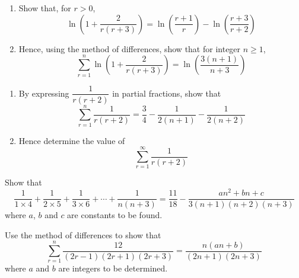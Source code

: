 \documentclass[leqno]{article}
\begin{document}
\djsFrontMatter
\begin{enumerate}[
  label=\textbf{\arabic*.},
  leftmargin=*,
  topsep=0pt,
  partopsep=0pt,
  parsep=0pt
]

\questionitem

\begin{enumerate}[label=\textbf{(\alph*)}]
  \item Show that, for $r>0$,
  \[
  \ln\left(1+\frac{2}{r(r+3)}\right)=\ln\left(\frac{r+1}{r}\right)-\ln\left(\frac{r+3}{r+2}\right)
  \]
  \item Hence, using the method of differences, show that for integer $n\geq 1$,
  \[
  \sum_{r=1}^{n}\ln\left(1+\frac{2}{r(r+3)}\right)=\ln\left(\frac{3(n+1)}{n+3}\right)
  \]
\end{enumerate}

\newpage

\questionitem

\begin{enumerate}[label=\textbf{(\alph*)}]
  \item By expressing $\dfrac{1}{r(r+2)}$ in partial fractions, show that
  \[
  \sum_{r=1}^{n} \frac{1}{r(r+2)} = \frac{3}{4} - \frac{1}{2(n+1)} - \frac{1}{2(n+2)}
  \]
  \item Hence determine the value of
  \[
  \sum_{r=1}^{\infty} \frac{1}{r(r+2)}
  \]
\end{enumerate}

\newpage

\questionitem

Show that
\[
\frac{1}{1 \times 4} + \frac{1}{2 \times 5} + \frac{1}{3 \times 6} + \cdots + \frac{1}{n(n+3)} = \frac{11}{18} - \frac{an^2+bn+c}{3(n+1)(n+2)(n+3)}
\]
where $a$, $b$ and $c$ are constants to be found.  \\

\newpage

\questionitem

Use the method of differences to show that
\[
\sum_{r=1}^{n} \frac{12}{(2r-1)(2r+1)(2r+3)} = \frac{n(an+b)}{(2n+1)(2n+3)}
\]
where $a$ and $b$ are integers to be determined.  \\


\end{enumerate}
\end{document}
